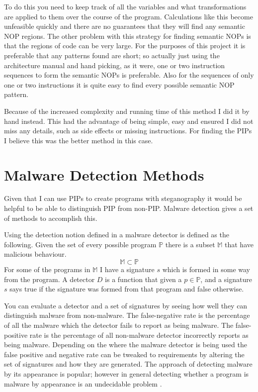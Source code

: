 \documentclass[10pt]{book}
\newenvironment{definition}[1][Definition]{\begin{trivlist}
\item[\hskip \labelsep {\bfseries #1}]}{\end{trivlist}}
\begin{document}
To do this you need to keep track of all the variables and what
transformations are applied to them over the course of the program.
Calculations like this become unfeasible quickly and there are no
guarantees that they will find any semantic NOP regions. The other
problem with this strategy for finding semantic NOPs is that the regions
of code can be very large. For the purposes of this project it is
preferable that any patterns found are short; so actually just using the
architecture manual and hand picking, as it were, one or two instruction
sequences to form the semantic NOPs is preferable. Also for the
sequences of only one or two instructions it is quite easy to find every
possible semantic NOP pattern.

Because of the increased complexity and running time of this method I
did it by hand instead. This had the advantage of being simple, easy and
ensured I did not miss any details, such as side effects or missing
instructions. For finding the PIPs I believe this was the better method
in this case.

\section{Malware Detection Methods}

Given that I can use PIPs to create programs with steganography it would
be helpful to be able to distinguish PIP from non-PIP. Malware detection
gives a set of methods to accomplish this.

\begin{definition}
Using the detection notion defined in \autocite{Preda:2007ky} a
malware detector is defined as the following. Given the set of every possible
program $\mathbb{P}$ there is a subset $\mathbb{M}$ that have malicious
behaviour. \[\mathbb{M\subset P}\] For some of the programs in
$\mathbb{M}$ I have a signature $s$ which is formed in some way from the
program. A detector $D$ is a function that given a $p\in\mathbb{P}$, and
a signature $s$ says true if the signature was formed from that program
and false otherwise.
\end{definition}

You can evaluate a detector and a set of signatures by seeing how well
they can distinguish malware from non-malware. The false-negative rate
is the percentage of all the malware which the detector fails to report
as being malware. The false-positive rate is the percentage of all
non-malware detector incorrectly reports as being malware. Depending on
the where the malware detector is being used the false positive and
negative rate can be tweaked to requirements by altering the set of
signatures and how they are generated. The approach of detecting malware
by its appearance is popular; however in general detecting whether a
program is malware by appearance is an undecidable problem
\autocite{Cohen:1987wt}\autocite{Shyamasundar:2010tl}.
\end{document}
